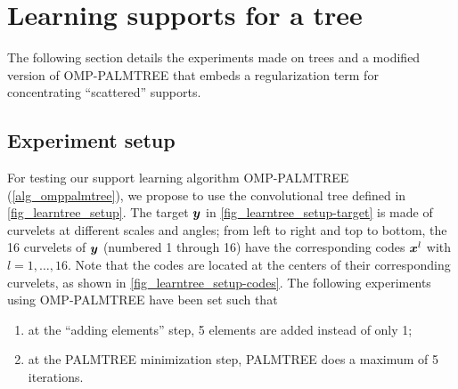 
\FloatBarrier
\section{Learning supports for a tree}
The following section details the experiments made on trees and a modified version of OMP-PALMTREE that embeds a regularization term for concentrating “scattered” supports.

\subsection{Experiment setup}

For testing our support learning algorithm OMP-PALMTREE (\cref{alg_omppalmtree}), we propose to use the convolutional tree defined in \cref{fig_learntree_setup}. The target $\bm{y}$ in \cref{fig_learntree_setup-target} is made of curvelets at different scales and angles; from left to right and top to bottom, the 16 curvelets of $\bm{y}$ (numbered 1 through 16) have the corresponding codes $\bm{x}^l$ with $l=1,\dots,16$. Note that the codes are located at the centers of their corresponding curvelets, as shown in \cref{fig_learntree_setup-codes}.
The following experiments using OMP-PALMTREE have been set such that
\begin{enumerate}[label=(\alph*)]
	\item at the “adding elements” step, 5 elements are added instead of only 1;
	\item at the PALMTREE minimization step, PALMTREE does a maximum of 5 iterations.
\end{enumerate}

